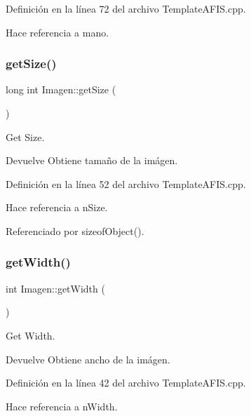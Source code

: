Definición en la línea 72 del archivo Template\+A\+F\+I\+S.\+cpp.



Hace referencia a mano.

\hypertarget{classImagen_afa3177842fed7750c8c51eeeaf108adb}{}\label{classImagen_afa3177842fed7750c8c51eeeaf108adb} 
\subsubsection{\texorpdfstring{get\+Size()}{getSize()}}
{\footnotesize\ttfamily long int Imagen\+::get\+Size (\begin{DoxyParamCaption}{ }\end{DoxyParamCaption})}



Get Size. 

\begin{DoxyReturn}{Devuelve}
Obtiene tamaño de la imágen. 
\end{DoxyReturn}


Definición en la línea 52 del archivo Template\+A\+F\+I\+S.\+cpp.



Hace referencia a n\+Size.



Referenciado por sizeof\+Object().

\hypertarget{classImagen_a4f973d4f8e63503c3e0b4649a95e0188}{}\label{classImagen_a4f973d4f8e63503c3e0b4649a95e0188} 
\subsubsection{\texorpdfstring{get\+Width()}{getWidth()}}
{\footnotesize\ttfamily int Imagen\+::get\+Width (\begin{DoxyParamCaption}{ }\end{DoxyParamCaption})}



Get Width. 

\begin{DoxyReturn}{Devuelve}
Obtiene ancho de la imágen. 
\end{DoxyReturn}


Definición en la línea 42 del archivo Template\+A\+F\+I\+S.\+cpp.



Hace referencia a n\+Width.

